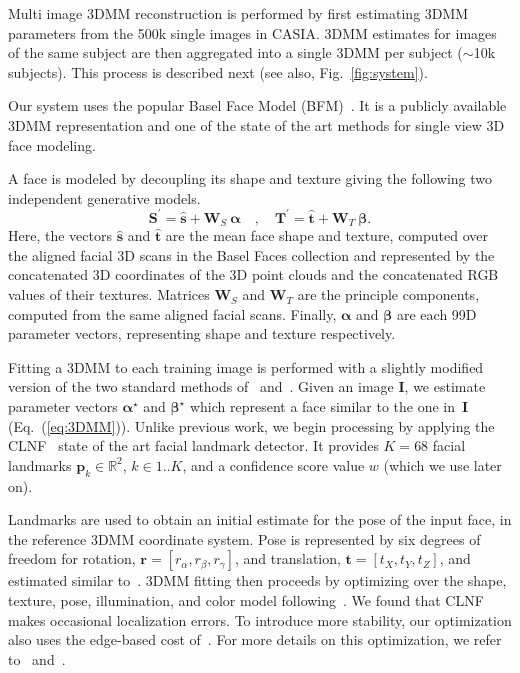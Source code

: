 \documentclass[10pt,twocolumn,letterpaper]{article}
\def\mbf#1{\mathbf{#1}}
\newcommand{\minisection}[1]{\vspace{1mm}\noindent{\bf #1}}
\begin{document}
Multi image 3DMM reconstruction is performed by first estimating 3DMM parameters from the 500k single images in CASIA. 3DMM estimates for images of the same subject are then aggregated into a single 3DMM per subject ($\sim$10k subjects). This process is described next (see also, Fig.~\ref{fig:system}).

\minisection{The 3DMM representation.} 
Our system uses the popular Basel Face Model (BFM)~\cite{paysan09basel}. It is a publicly available 3DMM representation and one of the state of the art methods for single view 3D face modeling. 

A face is modeled by decoupling its shape and texture giving the following two independent generative models.
\begin{equation}
\mbf{S}^{\prime} = \widehat{\mbf{s}} + \mbf{W}_S~\boldsymbol{\alpha}  \quad,  \quad
\mbf{T}^{\prime} = \widehat{\mbf{t}} + \mbf{W}_T~\boldsymbol{\beta}.
\label{eq:3DMM}
\end{equation}
Here, the vectors $\widehat{\mbf{s}}$ and $\widehat{\mbf{t}}$ are the mean face shape and texture, computed over the aligned facial 3D scans in the Basel Faces collection and represented by the concatenated 3D coordinates of the 3D point clouds and the concatenated RGB values of their textures. Matrices $\mbf{W}_S$ and $\mbf{W}_T$ are the principle components, computed from the same aligned facial scans. Finally, $\boldsymbol{\alpha}$ and $\boldsymbol{\beta}$ are each 99D parameter vectors, representing shape and texture respectively. 

\minisection{Single image 3DMM fitting.} Fitting a 3DMM to each training  image is performed with a slightly modified version of the two standard methods of~\cite{blanz:tpami:03} and~\cite{romdhani2005estimating}. Given an image $\mbf{I}$, we estimate parameter vectors $\boldsymbol{\alpha}^\star$ and $\boldsymbol{\beta}^\star$ which represent a face similar to the one in~$\mbf{I}$ (Eq.~(\ref{eq:3DMM})). Unlike previous work, we begin processing by applying the CLNF~\cite{Kanggeon:bmvc16} state of the art facial landmark detector. It provides $K=68$ facial landmarks $\mbf{p}_k \in \mathbb{R}^{2}$, $k\in 1..K$, and a confidence score value $w$ (which we use later on).

Landmarks are used to obtain an initial estimate for the pose of the input face, in the reference 3DMM coordinate system. Pose is represented by six degrees of freedom for rotation, $\mbf{r}=[r_\alpha, r_\beta, r_\gamma]$, and translation, $\mbf{t}=[t_X, t_Y, t_Z]$, and estimated similar to~\cite{hassner2013viewing}. 3DMM fitting then proceeds by optimizing over the shape, texture, pose, illumination, and color model following~\cite{blanz:tpami:03}. We found that CLNF makes occasional localization errors. To introduce more stability, our optimization also uses the edge-based cost of~\cite{romdhani2005estimating}. For more details on this optimization, we refer to~\cite{blanz:tpami:03} and~\cite{romdhani2005estimating}. 
\end{document}
